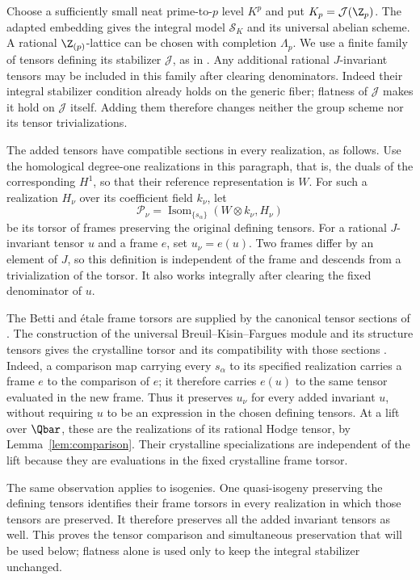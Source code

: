 Choose a sufficiently small neat prime-to-$p$ level $K^p$ and put
$K_p=\mathcal J(\Z_p)$.  The adapted embedding gives the integral
model $\mathcal S_K$ and its universal abelian scheme.  A rational
$\Z_{(p)}$-lattice can be chosen with completion $\Lambda_p$.
We use a finite family of tensors defining its stabilizer
$\mathcal J$, as in \cite[\S2.1.4]{KisinZhou2025}.
Any additional rational $J$-invariant tensors may be included in
this family after clearing denominators.  Indeed their integral
stabilizer condition already holds on the generic fiber; flatness
of $\mathcal J$ makes it hold on $\mathcal J$ itself.  Adding them
therefore changes neither the group scheme nor its tensor
trivializations.

The added tensors have compatible sections in every realization, as
follows.  Use the homological degree-one realizations in this paragraph,
that is, the duals of the corresponding $H^1$, so that their reference
representation is $W$.  For such a realization $H_\nu$ over its
coefficient field $k_\nu$, let
\[
 \mathcal P_\nu=\operatorname{Isom}_{\{s_\alpha\}}
                    (W\otimes k_\nu,H_\nu)
\]
be its torsor of frames preserving the original defining tensors.
For a rational $J$-invariant tensor $u$ and a frame $e$, set
$u_\nu=e(u)$.  Two frames differ by an element of $J$, so this
definition is independent of the frame and descends from a
trivialization of the torsor.  It also works integrally after clearing
the fixed denominator of $u$.

The Betti and \'etale frame torsors are supplied by the canonical
tensor sections of \cite[\S2.1.4]{KisinZhou2025}.  The construction
of the universal Breuil--Kisin--Fargues module and its structure
tensors gives the crystalline torsor and its compatibility with
those sections
\cite[\S\S2.1.13--2.1.14]{KisinZhou2025}.
Indeed, a comparison map carrying every $s_\alpha$ to its specified
realization carries a frame $e$ to the comparison of $e$; it therefore
carries $e(u)$ to the same tensor evaluated in the new frame.
Thus it preserves $u_\nu$ for every added invariant $u$, without
requiring $u$ to be an expression in the chosen defining tensors.
At a lift over $\Qbar$, these are the realizations of its rational
Hodge tensor, by Lemma~\ref{lem:comparison}.  Their crystalline
specializations are independent of the lift because they are
evaluations in the fixed crystalline frame torsor.

The same observation applies to isogenies.  One quasi-isogeny
preserving the defining tensors identifies their frame torsors in
every realization in which those tensors are preserved.  It
therefore preserves all the added invariant tensors as well.
This proves the tensor comparison and simultaneous preservation
that will be used below; flatness alone is used only to keep the
integral stabilizer unchanged.

